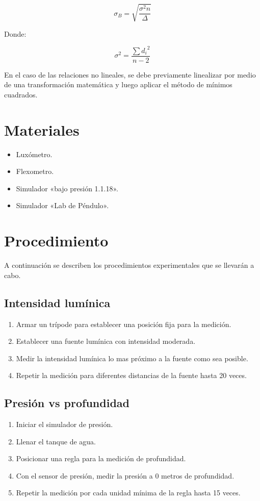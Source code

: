 \documentclass[letter,11pt]{article}
\begin{document}
\begin{equation}
    \sigma_B = \sqrt{\frac{\sigma^2 n}{\Delta}}
\end{equation}

Donde:

\begin{equation}
    \sigma^2 = \frac{\sum {d_i}^2}{n - 2}
\end{equation}

En el caso de las relaciones no lineales, se debe previamente linealizar por
medio de una transformación matemática y luego aplicar el método de mínimos
cuadrados.

\section{Materiales}
\begin{itemize}
\item Luxómetro.
\item Flexometro.
\item Simulador «bajo presión 1.1.18».
\item Simulador «Lab de Péndulo».
\end{itemize}

\section{Procedimiento}
A continuación se describen los procedimientos experimentales que se llevarán a
cabo.

\subsection{Intensidad lumínica}
\begin{enumerate}
\item Armar un trípode para establecer una posición fija para la medición.
\item Establecer una fuente lumínica con intensidad moderada.
\item Medir la intensidad lumínica lo mas próximo a la fuente como sea posible.
\item Repetir la medición para diferentes distancias de la fuente hasta 20
veces.
\end{enumerate}

\subsection{Presión vs profundidad}
\begin{enumerate}
\item Iniciar el simulador de presión.
\item Llenar el tanque de agua.
\item Posicionar una regla para la medición de profundidad.
\item Con el sensor de presión, medir la presión a 0 metros de profundidad.
\item Repetir la medición por cada unidad mínima de la regla hasta 15 veces.
\end{enumerate}
\end{document}
